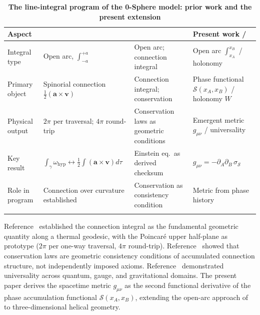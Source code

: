 \documentclass[%
 reprint, amsmath,amssymb, aps, prb, ]{revtex4-2}
\numberwithin{equation}{section}
\begin{document}
\begin{table}[t!]
\centering
\caption{\textbf{The line-integral program of the 0-Sphere model: prior work and the present extension}}
\label{tab:lineintegral_program}
\renewcommand{\arraystretch}{1.4}
\begin{tabular}{p{3.2cm}p{4.5cm}p{4.5cm}p{4.5cm}}
\toprule
\textbf{Aspect} & \textbf{\cite{hanamura29}} & \textbf{\cite{hanamura30}} & \textbf{Present work / \cite{hanamura31}} \\
\midrule
Integral type
& Open arc, $\int_{-a}^{+a}$
& Open arc; connection integral
& Open arc $\int_{x_A}^{x_B}$ / holonomy \\
\addlinespace[0.3cm]
Primary object
& Spinorial connection $\tfrac{1}{2}(\mathbf{a}{\times}\mathbf{v})$
& Connection integral; conservation
& Phase functional $\mathcal{S}(x_A,x_B)$ / holonomy $W$ \\
\addlinespace[0.3cm]
Physical output
& $2\pi$ per traversal; $4\pi$ round-trip
& Conservation laws as geometric conditions
& Emergent metric $g_{\mu\nu}$ / universality \\
\addlinespace[0.3cm]
Key result
& $\int_\gamma\omega_{\mathrm{hyp}}\leftrightarrow\tfrac{1}{2}\int(\mathbf{a}{\times}\mathbf{v})d\tau$
& Einstein eq.\ as derived checksum
& $g_{\mu\nu} = -\partial_{A}\partial_{B}\,\sigma_{\mathcal{S}}$ \\
\addlinespace[0.3cm]
Role in program
& Connection over curvature established
& Conservation as consistency condition
& Metric from phase history \\
\addlinespace[0.2cm]
\bottomrule
\end{tabular}
\vspace{0.2cm}
\begin{minipage}{0.95\textwidth}
\justifying\footnotesize
Reference~\cite{hanamura29} established the connection integral as the fundamental geometric quantity along a thermal geodesic, with the Poincar\'{e} upper half-plane as prototype ($2\pi$ per one-way traversal, $4\pi$ round-trip). Reference~\cite{hanamura30} showed that conservation laws are geometric consistency conditions of accumulated connection structure, not independently imposed axioms. Reference~\cite{hanamura31} demonstrated universality across quantum, gauge, and gravitational domains. The present paper derives the spacetime metric $g_{\mu\nu}$ as the second functional derivative of the phase accumulation functional $\mathcal{S}(x_A,x_B)$, extending the open-arc approach of~\cite{hanamura29} to three-dimensional helical geometry.
\end{minipage}
\end{table}
\end{document}
